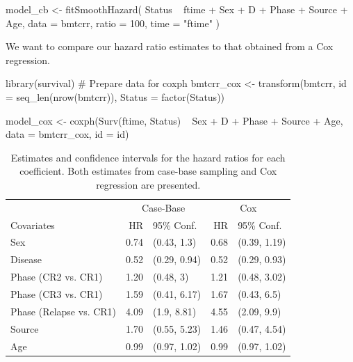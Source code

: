 \begin{Schunk}
\begin{Sinput}
model_cb <- fitSmoothHazard(
  Status ~ ftime + Sex + D + Phase + Source + Age,
  data = bmtcrr,
  ratio = 100,
  time = "ftime"
)
\end{Sinput}
\end{Schunk}

We want to compare our hazard ratio estimates to that obtained from a
Cox regression.

\begin{Schunk}
\begin{Sinput}
library(survival)
# Prepare data for coxph
bmtcrr_cox <- transform(bmtcrr, 
                        id = seq_len(nrow(bmtcrr)),
                        Status = factor(Status))

model_cox <- coxph(Surv(ftime, Status) ~ Sex + D + Phase + Source + Age,
                   data = bmtcrr_cox, id = id)
\end{Sinput}
\end{Schunk}

\begin{Schunk}
\begin{table}

\caption{\label{tab:bmtcrr-cis}Estimates and confidence intervals for the hazard ratios for each coefficient. Both estimates from case-base sampling and Cox regression are presented.}
\centering
\begin{tabular}[t]{lrlrl}
\toprule
\multicolumn{1}{c}{ } & \multicolumn{2}{c}{Case-Base} & \multicolumn{2}{c}{Cox} \\
\cmidrule(l{3pt}r{3pt}){2-3} \cmidrule(l{3pt}r{3pt}){4-5}
Covariates & HR & 95\% Conf. & HR & 95\% Conf.\\
\midrule
Sex & 0.74 & (0.43, 1.3) & 0.68 & (0.39, 1.19)\\
Disease & 0.52 & (0.29, 0.94) & 0.52 & (0.29, 0.93)\\
Phase (CR2 vs. CR1) & 1.20 & (0.48, 3) & 1.21 & (0.48, 3.02)\\
Phase (CR3 vs. CR1) & 1.59 & (0.41, 6.17) & 1.67 & (0.43, 6.5)\\
Phase (Relapse vs. CR1) & 4.09 & (1.9, 8.81) & 4.55 & (2.09, 9.9)\\
\addlinespace
Source & 1.70 & (0.55, 5.23) & 1.46 & (0.47, 4.54)\\
Age & 0.99 & (0.97, 1.02) & 0.99 & (0.97, 1.02)\\
\bottomrule
\end{tabular}
\end{table}

\end{Schunk}

